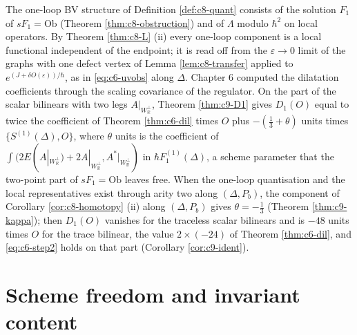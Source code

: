 \begin{remark}
The one-loop BV structure of Definition \ref{def:c8-quant} consists of the solution $F_1$ of $sF_1=\mathrm{Ob}$ (Theorem \ref{thm:c8-obstruction}) and of $\Lambda$ modulo $\hbar^2$ on local operators. By Theorem \ref{thm:c8-L} (ii) every one-loop component is a local functional independent of the endpoint; it is read off from the $\varepsilon\to0$ limit of the graphs with one defect vertex of Lemma \ref{lem:c8-transfer} applied to $e^{(J+\delta O(\varepsilon))/\hbar}$, as in \eqref{eq:c6-uvobs} along $\Delta$. Chapter 6 computed the dilatation coefficients through the scaling covariance of the regulator. On the part of the scalar bilinears with two legs $A|_{W_{\mathbb R}^\perp}$, Theorem \ref{thm:c9-D1} gives $D_1(O)$ equal to twice the coefficient of Theorem \ref{thm:c6-dil} times $O$ plus $-(\tfrac13+\theta)$ units times $\{S^{(1)}(\Delta),O\}$, where $\theta$ units is the coefficient of $\int(2E(A|_{W_{\mathbb R}^\perp})+2A|_{W_{\mathbb R}^\perp},A^*|_{W_{\mathbb R}^\perp})$ in $\hbar F_1^{(1)}(\Delta)$, a scheme parameter that the two-point part of $sF_1=\mathrm{Ob}$ leaves free. When the one-loop quantisation and the local representatives exist through arity two along $(\Delta,P_b)$, the component of Corollary \ref{cor:c8-homotopy} (ii) along $(\Delta,P_b)$ gives $\theta=-\tfrac13$ (Theorem \ref{thm:c9-kappa}); then $D_1(O)$ vanishes for the traceless scalar bilinears and is $-48$ units times $O$ for the trace bilinear, the value $2\times(-24)$ of Theorem \ref{thm:c6-dil}, and \eqref{eq:c6-step2} holds on that part (Corollary \ref{cor:c9-ident}).
\end{remark}

\section{Scheme freedom and invariant content}

